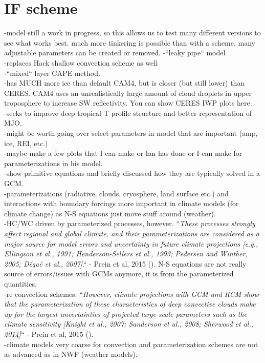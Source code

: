 \documentclass[letterpaper,12pt,titlepage,oneside,final]{book}
\begin{document}
\section{IF scheme}
-model still a work in progress, so this allows us to test many different versions to see what works best. much more tinkering is possible than with a scheme. many adjustable parameters can be created or removed.
-``leaky pipe`` model
\\
-replaces Hack shallow convection scheme as well
\\
-``mixed`` layer CAPE method.
\\
-has MUCH more ice than default CAM4, but is closer (but still lower) than CERES. CAM4 uses an unrealistically large amount of cloud droplets in upper troposphere to increase SW reflectivity. You can show CERES IWP plots here.
\\
-seeks to improve deep tropical T profile structure and better representation of MJO.
\\
-might be worth going over select parameters in model that are important (amp, ice, REI, etc.)
\\
-maybe make a few plots that I can make or Ian has done or I can make for parameterizations in his model.
\\
-show primitive equations and briefly discussed how they are typically solved in a GCM.
\\
-parameterizations (radiative, clouds, cryosphere, land surface etc.) and interactions with boundary forcings more important in climate models (for climate change) as N-S equations just move stuff around (weather). 
\\
-HC/WC driven by parameterized processes, however. ``\textit{These processes strongly affect regional and global climate, and their parameterizations are considered as a major source for model errors and uncertainty in future climate projections [e.g., Ellingson et al., 1991; Henderson-Sellers et al., 1993; Pedersen and Winther, 2005; Déqué et al., 2007]}.`` - Prein et al, 2015 (\citep{prein_review_2015}). N-S equations are not really source of errors/issues with GCMs anymore, it is from the parameterized quantities.
\\
-re convection schemes: ``\textit{However, climate projections with GCM and RCM show that the parameterization of these characteristics of deep convective clouds make up for the largest uncertainties of projected large-scale parameters such as the climate sensitivity [Knight et al., 2007; Sanderson et al., 2008; Sherwood et al., 2014]}`` - Prein et al, 2015 (\citep{prein_review_2015}).
\\
-climate models very coarse for convection and parameterization schemes are not as advanced as in NWP (weather models).
\\
\end{document}
